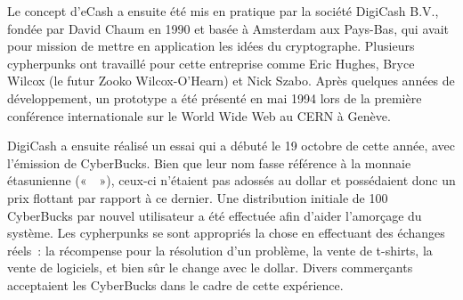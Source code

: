 Le concept d'eCash a ensuite été mis en pratique par la société DigiCash B.V., fondée par David Chaum en 1990 et basée à Amsterdam aux Pays-Bas, qui avait pour mission de mettre en application les idées du cryptographe. Plusieurs cypherpunks ont travaillé pour cette entreprise comme Eric Hughes, Bryce Wilcox (le futur Zooko Wilcox-O'Hearn) et Nick Szabo. Après quelques années de développement, un prototype a été présenté en mai 1994 lors de la première conférence internationale sur le World Wide Web au CERN à Genève.

DigiCash a ensuite réalisé un essai qui a débuté le 19 octobre de cette année, avec l'émission de CyberBucks. Bien que leur nom fasse référence à la monnaie étasunienne («~~»), ceux-ci n'étaient pas adossés au dollar et possédaient donc un prix flottant par rapport à ce dernier. Une distribution initiale de 100 CyberBucks par nouvel utilisateur a été effectuée afin d'aider l'amorçage du système. Les cypherpunks se sont appropriés la chose en effectuant des échanges réels~: la récompense pour la résolution d'un problème, la vente de t-shirts, la vente de logiciels, et bien sûr le change avec le dollar. Divers commerçants acceptaient les CyberBucks dans le cadre de cette expérience.

